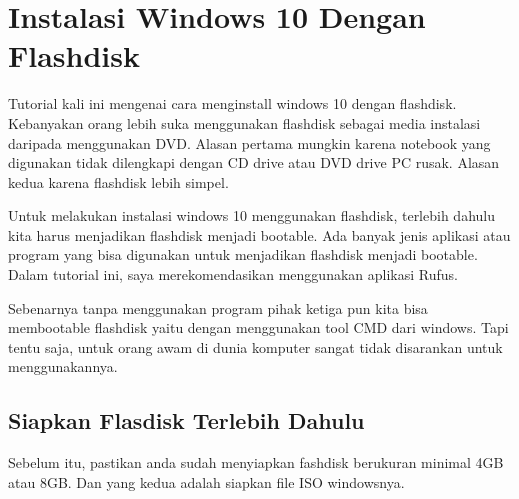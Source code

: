 \section{Instalasi Windows 10 Dengan Flashdisk}
Tutorial kali ini mengenai cara menginstall windows 10 dengan flashdisk. Kebanyakan orang lebih suka menggunakan flashdisk sebagai media instalasi daripada menggunakan DVD. Alasan pertama mungkin karena notebook yang digunakan tidak dilengkapi dengan CD drive atau DVD drive PC rusak. Alasan kedua karena flashdisk lebih simpel. 

Untuk melakukan instalasi windows 10 menggunakan flashdisk, terlebih dahulu kita harus menjadikan flashdisk menjadi bootable. Ada banyak jenis aplikasi atau program yang bisa digunakan untuk menjadikan flashdisk menjadi bootable. Dalam tutorial ini, saya merekomendasikan menggunakan aplikasi Rufus. 

Sebenarnya tanpa menggunakan program pihak ketiga pun kita bisa membootable flashdisk yaitu dengan menggunakan tool CMD dari windows. Tapi tentu saja, untuk orang awam di dunia komputer sangat tidak disarankan untuk menggunakannya. 

\subsection{Siapkan Flasdisk Terlebih Dahulu}
Sebelum itu, pastikan anda sudah menyiapkan fashdisk berukuran minimal 4GB atau 8GB. Dan yang kedua adalah siapkan file ISO windowsnya. 



